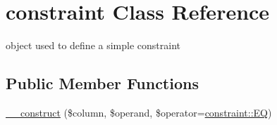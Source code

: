 \hypertarget{classconstraint}{\section{constraint Class Reference}
\label{classconstraint}
}


object used to define a simple constraint  


\subsection*{Public Member Functions}
\begin{DoxyCompactItemize}
\item 
\hyperlink{classconstraint_a9e4321b5cf73af8119e6ecaac6069bbc}{\-\_\-\-\_\-construct} (\$column, \$operand, \$operator=\hyperlink{classconstraint_ac28f80db55e3b33606f846cf0b2938d5}{constraint\-::\-E\-Q})
\end{DoxyCompactItemize}

